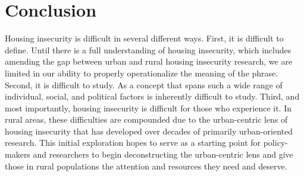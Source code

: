 \chapter{Conclusion}	%

Housing insecurity is difficult in several different ways. First, it is difficult to define. Until there is a full understanding of housing insecurity, which includes amending the gap between urban and rural housing insecurity research, we are limited in our ability to properly operationalize the meaning of the phrase. Second, it is difficult to study. As a concept that spans such a wide range of individual, social, and political factors is inherently difficult to study. Third, and most importantly, housing insecurity is difficult for those who experience it. In rural areas, these difficulties are compounded due to the urban-centric lens of housing insecurity that has developed over decades of primarily urban-oriented research. This initial exploration hopes to serve as a starting point for policy-makers and researchers to begin deconstructing the urban-centric lens and give those in rural populations the attention and resources they need and deserve. 

\endinput